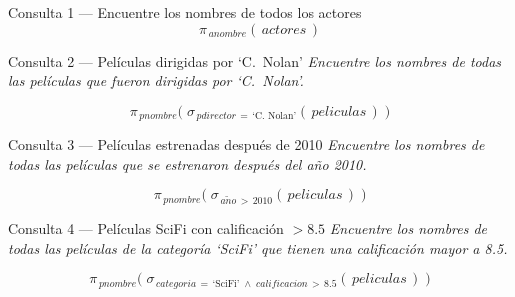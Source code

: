 \documentclass[12pt,a4paper]{article}
\begin{document}
\begin{querybox}{Consulta 1 --- Encuentre los nombres de todos los actores}
\[
  \pi_{\,anombre}\!\left(\, actores \,\right)
\]
\end{querybox}

\vspace{0.4cm}

\begin{querybox}{Consulta 2 --- Películas dirigidas por `C.\ Nolan'}
\textit{Encuentre los nombres de todas las películas que fueron dirigidas
por \textnormal{`C.~Nolan'}.}

\[
  \pi_{\,pnombre}\!\Big(\;
    \sigma_{\,pdirector\,=\,\text{`C.\ Nolan'}}\!\left(\, peliculas \,\right)
  \;\Big)
\]
\end{querybox}

\vspace{0.4cm}

\begin{querybox}{Consulta 3 --- Películas estrenadas después de 2010}
\textit{Encuentre los nombres de todas las películas que se estrenaron
después del año 2010.}

\[
  \pi_{\,pnombre}\!\Big(\;
    \sigma_{\,a\tilde{n}o\,>\,2010}\!\left(\, peliculas \,\right)
  \;\Big)
\]
\end{querybox}

\vspace{0.4cm}

\begin{querybox}{Consulta 4 --- Películas SciFi con calificación $> 8.5$}
\textit{Encuentre los nombres de todas las películas de la categoría
\textnormal{`SciFi'} que tienen una calificación mayor a 8.5.}

\[
  \pi_{\,pnombre}\!\Big(\;
    \sigma_{\,categoria\,=\,\text{`SciFi'}
      \;\wedge\;
      calificacion\,>\,8.5}\!\left(\, peliculas \,\right)
  \;\Big)
\]
\end{querybox}
\end{document}
